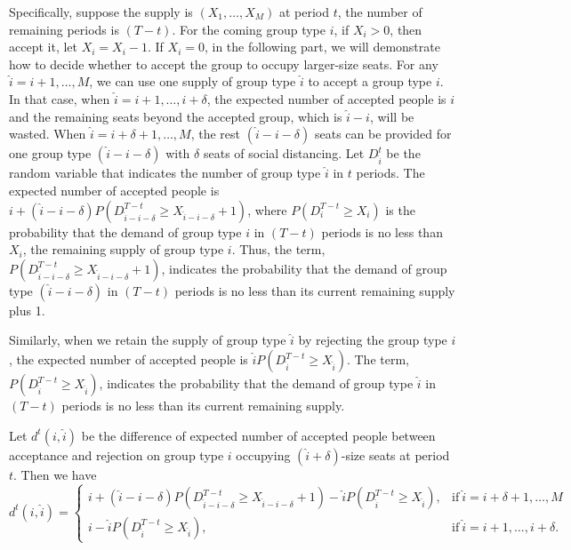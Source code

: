 Specifically, suppose the supply is $(X_1, \ldots, X_M)$ at period $t$, the number of remaining periods is $(T-t)$. For the coming group type $i$, if $X_i > 0$, then accept it, let $X_i = X_i -1$.
If $X_i = 0$, in the following part, we will demonstrate how to decide whether to accept the group to occupy larger-size seats. For any $\hat{i}=i+1, \ldots, M$, we can use one supply of group type $\hat{i}$ to accept a group type $i$. In that case, when $\hat{i} = i+1, \ldots, i+\delta$, the expected number of accepted people is $i$ and the remaining seats beyond the accepted group, which is $\hat{i}-i$, will be wasted. When $\hat{i} = i+\delta+1, \ldots, M$, the rest $(\hat{i}-i-\delta)$ seats can be provided for one group type $(\hat{i}-i-\delta)$ with $\delta$ seats of social distancing. Let $D_{\hat{i}}^{t}$ be the random variable that indicates the number of group type $\hat{i}$ in $t$ periods. The expected number of accepted people is $i + (\hat{i}-i-\delta)P(D_{\hat{i}-i-\delta}^{T-t} \geq X_{\hat{i}-i-\delta}+1)$, where $P(D_i^{T-t} \geq X_i)$ is the probability that the demand of group type $i$ in $(T-t)$ periods is no less than $X_i$, the remaining supply of group type $i$. Thus, the term, $P(D_{\hat{i}-i-\delta}^{T-t} \geq X_{\hat{i}-i-\delta}+1)$, indicates the probability that the demand of group type $(\hat{i}-i-\delta)$ in $(T-t)$ periods is no less than its current remaining supply plus 1. 

Similarly, when we retain the supply of group type $\hat{i}$ by rejecting the group type $i$, the expected number of accepted people is $\hat{i} P(D_{\hat{i}}^{T-t} \geq X_{\hat{i}})$. The term, $P(D_{\hat{i}}^{T-t} \geq X_{\hat{i}})$, indicates the probability that the demand of group type $\hat{i}$ in $(T-t)$ periods is no less than its current remaining supply.

Let $d^{t}(i,\hat{i})$ be the difference of expected number of accepted people between acceptance and rejection on group type $i$ occupying $(\hat{i}+\delta)$-size seats at period $t$. Then we have
\begin{equation*}
	d^{t}(i,\hat{i}) = \begin{cases}
    i + (\hat{i}-i-\delta)P(D_{\hat{i}-i-\delta}^{T-t} \geq X_{\hat{i}-i-\delta}+1) - \hat{i} P(D_{\hat{i}}^{T-t} \geq X_{\hat{i}}), &\text{if}~ \hat{i} = i+\delta+1, \ldots, M \\
    i - \hat{i} P(D_{\hat{i}}^{T-t} \geq X_{\hat{i}}), &\text{if}~ \hat{i} = i+1, \ldots, i+\delta.
		\end{cases}
\end{equation*}


